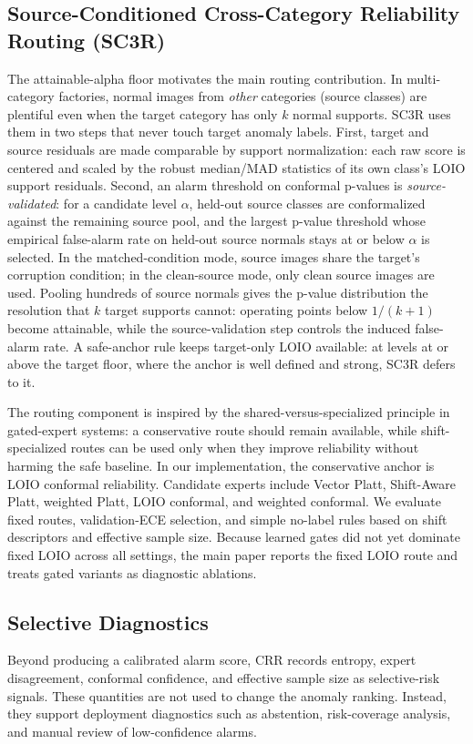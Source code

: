 \subsection{Source-Conditioned Cross-Category Reliability Routing (SC3R)}
The attainable-alpha floor motivates the main routing contribution. In multi-category factories, normal images from \emph{other} categories (source classes) are plentiful even when the target category has only $k$ normal supports. SC3R uses them in two steps that never touch target anomaly labels. First, target and source residuals are made comparable by support normalization: each raw score is centered and scaled by the robust median/MAD statistics of its own class's LOIO support residuals. Second, an alarm threshold on conformal p-values is \emph{source-validated}: for a candidate level $\alpha$, held-out source classes are conformalized against the remaining source pool, and the largest p-value threshold whose empirical false-alarm rate on held-out source normals stays at or below $\alpha$ is selected. In the matched-condition mode, source images share the target's corruption condition; in the clean-source mode, only clean source images are used. Pooling hundreds of source normals gives the p-value distribution the resolution that $k$ target supports cannot: operating points below $1/(k{+}1)$ become attainable, while the source-validation step controls the induced false-alarm rate. A safe-anchor rule keeps target-only LOIO available: at levels at or above the target floor, where the anchor is well defined and strong, SC3R defers to it.

The routing component is inspired by the shared-versus-specialized principle in gated-expert systems: a conservative route should remain available, while shift-specialized routes can be used only when they improve reliability without harming the safe baseline. In our implementation, the conservative anchor is LOIO conformal reliability. Candidate experts include Vector Platt, Shift-Aware Platt, weighted Platt, LOIO conformal, and weighted conformal. We evaluate fixed routes, validation-ECE selection, and simple no-label rules based on shift descriptors and effective sample size. Because learned gates did not yet dominate fixed LOIO across all settings, the main paper reports the fixed LOIO route and treats gated variants as diagnostic ablations.

\subsection{Selective Diagnostics}
Beyond producing a calibrated alarm score, CRR records entropy, expert disagreement, conformal confidence, and effective sample size as selective-risk signals. These quantities are not used to change the anomaly ranking. Instead, they support deployment diagnostics such as abstention, risk-coverage analysis, and manual review of low-confidence alarms.
